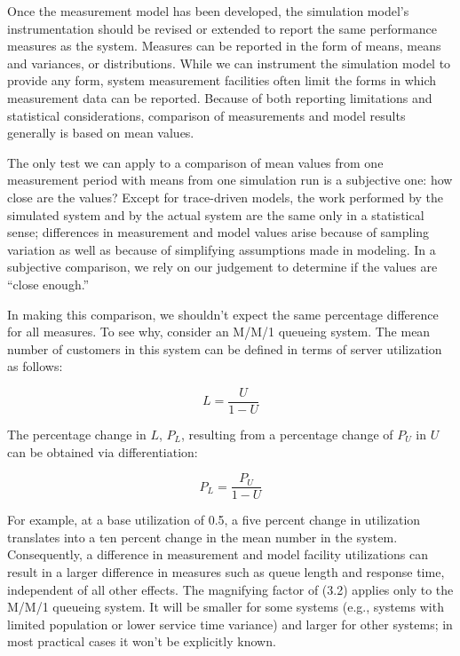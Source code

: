 Once the measurement model has been developed, the simulation model's
instrumentation should be revised or extended to report the same performance
measures as the system. Measures can be reported in the form of means, means
and variances, or distributions. While we can instrument the simulation model
 to provide any form, system measurement facilities often limit the forms in
which measurement data can be reported. Because of both reporting limitations
and statistical considerations, comparison of measurements and model results
generally is based on mean values.

The only test we can apply to a comparison of mean values from one measurement
period with means from one simulation run is a subjective one: how close are
the values? Except for trace-driven models, the work performed by the
simulated system and by the actual system are the same only in a statistical
sense; differences in measurement and model values arise because of sampling
variation as well as because of simplifying 
\noindent assumptions made in modeling. In a
subjective comparison, we rely on our judgement to determine if the values are
``close enough.''

In making this comparison, we shouldn't expect the same percentage difference
for all measures. To see why, consider an M/M/1 queueing system. The mean
number of customers in this system can be defined in terms of server
utilization as follows:

\begin{equation}
L = \frac{U}{1-U}
\end{equation}

The percentage change in $L$, $P_L$, resulting from a percentage change of
$P_U$ in $U$ can be obtained via differentiation:

\begin{equation}
P_L = \frac{P_U}{1-U}
\end{equation}

For example, at a base utilization of 0.5, a five percent change in
utilization translates into a ten percent change in the mean number in the
system. Consequently, a difference in measurement and model facility
utilizations can result in a larger difference in measures such as queue
length and response time, independent of all other effects. The magnifying
factor of (3.2) applies only to the M/M/1 queueing system. It
will be smaller for some systems (e.g., systems with limited population or
lower service time variance) and larger for other systems; in most practical
cases it won't be explicitly known.

